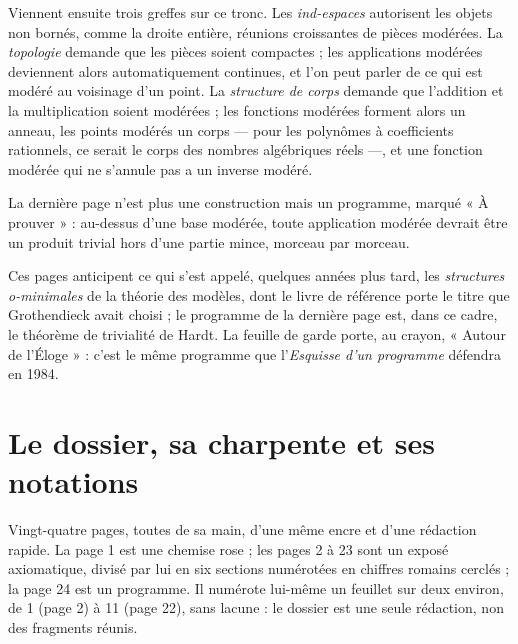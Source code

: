 \documentclass[11pt,a4paper]{article}
\begin{document}
\begin{resume}
Viennent ensuite trois greffes sur ce tronc. Les \emph{ind-espaces}
autorisent les objets non bornés, comme la droite entière, réunions
croissantes de pièces modérées. La \emph{topologie} demande que les pièces
soient compactes ; les applications modérées deviennent alors automatiquement
continues, et l'on peut parler de ce qui est modéré au voisinage d'un point.
La \emph{structure de corps} demande que l'addition et la multiplication
soient modérées ; les fonctions modérées forment alors un anneau, les points
modérés un corps — pour les polynômes à coefficients rationnels, ce serait le
corps des nombres algébriques réels —, et une fonction modérée qui ne
s'annule pas a un inverse modéré.

La dernière page n'est plus une construction mais un programme, marqué
« À prouver » : au-dessus d'une base modérée, toute application modérée
devrait être un produit trivial hors d'une partie mince, morceau par morceau.

Ces pages anticipent ce qui s'est appelé, quelques années plus tard, les
\emph{structures o-minimales} de la théorie des modèles, dont le livre de
référence porte le titre que Grothendieck avait choisi ; le programme de la
dernière page est, dans ce cadre, le théorème de trivialité de Hardt. La
feuille de garde porte, au crayon, « Autour de l'Éloge » : c'est le même
programme que l'\emph{Esquisse d'un programme} défendra en 1984.

\end{resume}

\section*{Le dossier, sa charpente et ses notations}

Vingt-quatre pages, toutes de sa main, d'une même encre et d'une rédaction
rapide. La page 1 est une chemise rose ; les pages 2 à 23 sont un exposé
axiomatique, divisé par lui en six sections numérotées en chiffres romains
cerclés ; la page 24 est un programme. Il numérote lui-même un feuillet sur
deux environ, de 1 (page 2) à 11 (page 22), sans lacune : le dossier est une
seule rédaction, non des fragments réunis.
\end{document}
